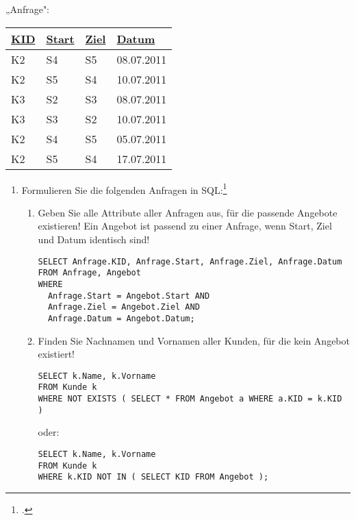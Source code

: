 \documentclass{lehramt-informatik-minimal}
\def\TmpUeber#1{{\setul{-0.9em}{}\ul{#1}}}
\begin{document}
{\begin{multicols}{2}
„Anfrage":

\begin{tabular}{|l|l|l|l|}
\hline
\ul{KID} & \TmpUeber{Start} & \TmpUeber{Ziel} & \ul{Datum}\\\hline\hline
K2 & S4 & S5 & 08.07.2011\\\hline
K2 & S5 & S4 & 10.07.2011\\\hline
K3 & S2 & S3 & 08.07.2011\\\hline
K3 & S3 & S2 & 10.07.2011\\\hline
K2 & S4 & S5 & 05.07.2011\\\hline
K2 & S5 & S4 & 17.07.2011\\\hline
\end{tabular}
\end{multicols}
}

\begin{enumerate}
\item Formulieren Sie die folgenden Anfragen in SQL:\footcite{db:pu:wh}

\renewcommand{\labelenumii}{(\alph{enumi})}
\begin{enumerate}

%

\item Geben Sie alle Attribute aller Anfragen aus, für die passende
Angebote existieren! Ein Angebot ist passend zu einer Anfrage, wenn
Start, Ziel und Datum identisch sind!

\begin{antwort}[richtig]
\begin{verbatim}
SELECT Anfrage.KID, Anfrage.Start, Anfrage.Ziel, Anfrage.Datum
FROM Anfrage, Angebot
WHERE
  Anfrage.Start = Angebot.Start AND
  Anfrage.Ziel = Angebot.Ziel AND
  Anfrage.Datum = Angebot.Datum;
\end{verbatim}
\end{antwort}

%

\item Finden Sie Nachnamen und Vornamen aller Kunden, für die kein
Angebot existiert!

\begin{verbatim}
SELECT k.Name, k.Vorname
FROM Kunde k
WHERE NOT EXISTS ( SELECT * FROM Angebot a WHERE a.KID = k.KID )
\end{verbatim}

oder:

\begin{verbatim}
SELECT k.Name, k.Vorname
FROM Kunde k
WHERE k.KID NOT IN ( SELECT KID FROM Angebot );
\end{verbatim}


\end{enumerate}
\end{enumerate}
\end{document}
